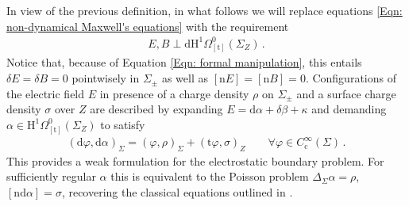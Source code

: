	\noindent In view of the previous definition, in what follows we will replace equations \eqref{Eqn: non-dynamical Maxwell's equations} with the requirement
	\begin{align}\label{Eqn: non-dynamical Maxwell's equations with Hodge decomposition}
		E,B\perp\mathrm{d}\mathrm{H}^1\Omega^0_{[\mathrm{t}]}(\Sigma_Z)\,.
	\end{align}
	Notice that, because of Equation \eqref{Eqn: formal manipulation}, this entails $\delta E=\delta B=0$ pointwisely in $\Sigma_\pm$ as well as $[\mathrm{n}E]=[\mathrm{n}B]=0$.
	Configurations of the electric field $E$ in presence of a charge density $\rho$ on $\Sigma_\pm$ and a surface charge density $\sigma$ over $Z$ are described by expanding $E=\mathrm{d}\alpha+\delta\beta+\kappa$ and demanding $\alpha\in\mathrm{H}^1\Omega^0_{[\mathrm{t}]}(\Sigma_Z)$ to satisfy
	\begin{align*}
		(\mathrm{d}\varphi,\mathrm{d}\alpha)_\Sigma=
		(\varphi,\rho)_\Sigma+(\mathrm{t}\varphi,\sigma)_{Z}\qquad
		\forall\varphi\in C^\infty_{\mathrm{c}}(\Sigma)\,.
	\end{align*}
	This provides a weak formulation for the electrostatic boundary problem. For sufficiently regular $\alpha$ this is equivalent to the Poisson problem $\Delta_\Sigma\alpha=\rho$, $[\mathrm{n}\mathrm{d}\alpha]=\sigma$, recovering the classical equations outlined in \parencite[Sec. I.5]{Jackson-99}.

